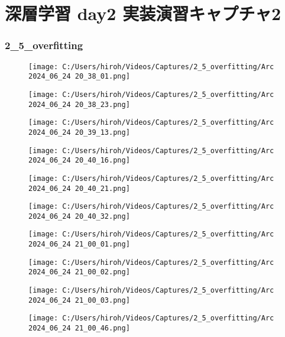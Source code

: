 \documentclass{ltjsarticle}
\begin{document}
\part*{深層学習 day2 実装演習キャプチャ2}

\section{2\_5\_overfitting}
\begin{figure}[htbp]
  \centering
  \texttt{[image: C:/Users/hiroh/Videos/Captures/2\_5\_overfitting/Arc 2024\_06\_24 20\_38\_01.png]}
\end{figure}
\begin{figure}[htbp]
  \centering
  \texttt{[image: C:/Users/hiroh/Videos/Captures/2\_5\_overfitting/Arc 2024\_06\_24 20\_38\_23.png]}
\end{figure}
\begin{figure}[htbp]
  \centering
  \texttt{[image: C:/Users/hiroh/Videos/Captures/2\_5\_overfitting/Arc 2024\_06\_24 20\_39\_13.png]}
\end{figure}
\begin{figure}[htbp]
  \centering
  \texttt{[image: C:/Users/hiroh/Videos/Captures/2\_5\_overfitting/Arc 2024\_06\_24 20\_40\_16.png]}
\end{figure}
\begin{figure}[htbp]
  \centering
  \texttt{[image: C:/Users/hiroh/Videos/Captures/2\_5\_overfitting/Arc 2024\_06\_24 20\_40\_21.png]}
\end{figure}
\begin{figure}[htbp]
  \centering
  \texttt{[image: C:/Users/hiroh/Videos/Captures/2\_5\_overfitting/Arc 2024\_06\_24 20\_40\_32.png]}
\end{figure}
\begin{figure}[htbp]
  \centering
  \texttt{[image: C:/Users/hiroh/Videos/Captures/2\_5\_overfitting/Arc 2024\_06\_24 21\_00\_01.png]}
\end{figure}
\begin{figure}[htbp]
  \centering
  \texttt{[image: C:/Users/hiroh/Videos/Captures/2\_5\_overfitting/Arc 2024\_06\_24 21\_00\_02.png]}
\end{figure}
\begin{figure}[htbp]
  \centering
  \texttt{[image: C:/Users/hiroh/Videos/Captures/2\_5\_overfitting/Arc 2024\_06\_24 21\_00\_03.png]}
\end{figure}
\begin{figure}[htbp]
  \centering
  \texttt{[image: C:/Users/hiroh/Videos/Captures/2\_5\_overfitting/Arc 2024\_06\_24 21\_00\_46.png]}
\end{figure}
\end{document}
